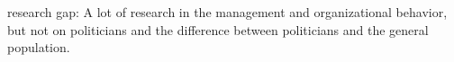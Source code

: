 research gap: A lot of research in the management and organizational behavior, but not on politicians and the difference between politicians and the general population. 